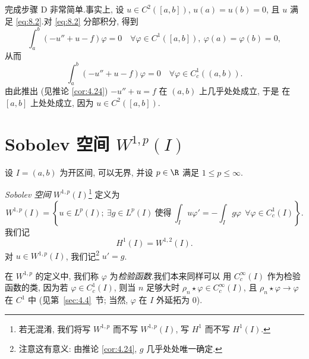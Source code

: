 完成步骤 D 非常简单.事实上, 设 $u\in C^2([a,b])$, $u(a)=u(b)=0$, 且 $u$ 满足
\eqref{eq:8.2}.对 \eqref{eq:8.2} 分部积分, 得到
\begin{equation*}
\int_a^b(-u''+u-f)\varphi=0
\quad\forall\varphi\in C^1([a,b]),\ \varphi(a)=\varphi(b)=0,
\end{equation*}
从而
\begin{equation*}
\int_a^b(-u''+u-f)\varphi=0
\quad\forall\varphi\in C_c^1((a,b)).
\end{equation*}
由此推出 (见推论  \ref{cor:4.24}) $-u''+u=f$ 在 $(a,b)$ 上几乎处处成立, 于是
在 $[a,b]$ 上处处成立, 因为 $u\in C^2([a,b])$.

\section{
Sobolev 空间 $W^{1,p}(I)$}
\label{sec:8.2}

设 $I=(a,b)$ 为开区间, 可以无界, 并设 $p\in\R$ 满足 $1\le p\le\infty$.

\begin{definition}
\emph{Sobolev 空间} $W^{1,p}(I)$\footnote{若无混淆, 我们将写 $W^{1,p}$ 而不写
$W^{1,p}(I)$, 写 $H^1$ 而不写 $H^1(I)$.} 定义为
\begin{equation*}
W^{1,p}(I)=\left\{u\in L^p(I);\ \exists g\in L^p(I)\ \text{使得}\
\int_I u\varphi'=-\int_I g\varphi\ \ \forall\varphi\in C_c^1(I)\right\}.
\end{equation*}
我们记
\begin{equation*}
H^1(I)=W^{1,2}(I).
\end{equation*}
对 $u\in W^{1,p}(I)$, 我们记\footnote{注意这有意义: 由推论  \ref{cor:4.24},
$g$ 几乎处处唯一确定.} $u'=g$.
\end{definition}

\begin{remark}
\label{rem:8.1}
在 $W^{1,p}$ 的定义中, 我们称 $\varphi$ 为\emph{检验函数}.我们本来同样可以
用 $C_c^\infty(I)$ 作为检验函数的类, 因为若 $\varphi\in C_c^1(I)$, 则当 $n$
足够大时 $\rho_n\star\varphi\in C_c^\infty(I)$, 且 $\rho_n\star\varphi\to\varphi$
在 $C^1$ 中 (见第~\ref{sec:4.4}~节; 当然, $\varphi$ 在 $I$ 外延拓为 $0$).
\end{remark}


